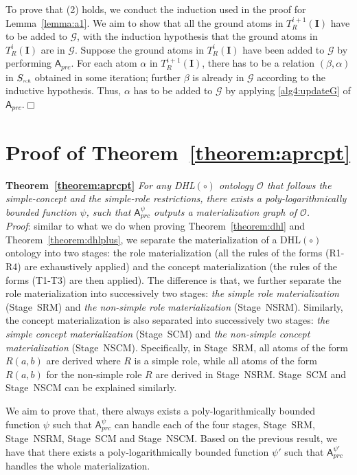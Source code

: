 \documentclass[final,1p,times]{elsarticle}
\begin{document}
To prove that (2) holds, we conduct the induction used in the proof for Lemma~\ref{lemma:a1}.
We aim to show that all the ground atoms in $T_R^{i+1}(\textbf{I})$ have to be added to $\mathcal{G}$,
with the induction hypothesis that the ground atoms in $T_R^{i}(\textbf{I})$ are in $\mathcal{G}$.
Suppose the ground atoms in $T_R^{i}(\textbf{I})$ have been added to $\mathcal{G}$ by
performing $\mathsf{A}_{prc}$.
For each atom $\alpha$ in $T_R^{i+1}(\textbf{I})$, there has to be a relation $(\beta,\alpha)$
in $S_{\textit{\tiny rch}}$ obtained in some iteration; further
$\beta$ is already in $\mathcal{G}$ according to the inductive hypothesis. Thus,
$\alpha$ has to be added to $\mathcal{G}$ by applying \ref{alg4:updateG}
of $\mathsf{A}_{prc}$.\hfill$\Box$


\section{Proof of Theorem~\ref{theorem:aprcpt}}

\textbf{Theorem~\ref{theorem:aprcpt}}
\emph{For any DHL$(\circ)$ ontology $\mathcal{O}$ that follows the simple-concept and the simple-role
restrictions,
there exists a poly-logarithmically bounded function $\psi$,
such that $\mathsf{A}_{prc}^{\psi}$ outputs
a materialization graph of $\mathcal{O}$.}\\

\noindent\emph{Proof}: similar to what we do when proving
Theorem~\ref{theorem:dhl} and Theorem~\ref{theorem:dhlplus},
we separate the materialization of a DHL$(\circ)$ ontology
into two stages: the role materialization (all the rules
of the forms (R1-R4) are exhaustively applied) and the concept materialization
(the rules of the forms (T1-T3)
are then applied). The difference is that, we further separate the role materialization
into successively two stages: \emph{the simple role materialization} (Stage~SRM) and
\emph{the non-simple role materialization} (Stage~NSRM).
Similarly, the concept materialization is also separated into successively two stages:
\emph{the simple concept materialization} (Stage~SCM) and
\emph{the non-simple concept materialization} (Stage~NSCM).
Specifically, in Stage~SRM, all atoms of the form $R(a,b)$ are derived
where $R$ is a simple role, while all atoms of the form $R(a,b)$ for the non-simple
role $R$ are derived in Stage~NSRM. Stage~SCM and Stage~NSCM can be explained similarly.

We aim to prove that, there always exists a poly-logarithmically bounded function $\psi$
such that $\mathsf{A}_{prc}^{\psi}$ can handle each of the four stages, Stage~SRM,
Stage~NSRM, Stage~SCM and Stage~NSCM. Based on the previous result, we have that
there exists a poly-logarithmically bounded function $\psi'$
such that $\mathsf{A}_{prc}^{\psi'}$ handles the whole materialization.
\end{document}
